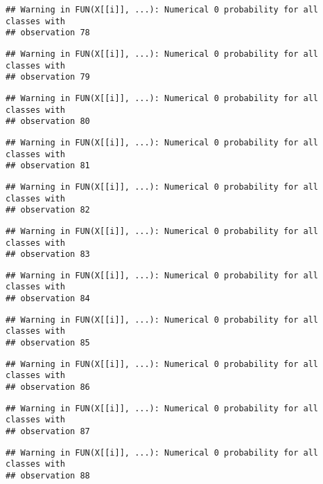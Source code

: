 \documentclass[
]{article}
\begin{document}
\begin{verbatim}
## Warning in FUN(X[[i]], ...): Numerical 0 probability for all classes with
## observation 78
\end{verbatim}

\begin{verbatim}
## Warning in FUN(X[[i]], ...): Numerical 0 probability for all classes with
## observation 79
\end{verbatim}

\begin{verbatim}
## Warning in FUN(X[[i]], ...): Numerical 0 probability for all classes with
## observation 80
\end{verbatim}

\begin{verbatim}
## Warning in FUN(X[[i]], ...): Numerical 0 probability for all classes with
## observation 81
\end{verbatim}

\begin{verbatim}
## Warning in FUN(X[[i]], ...): Numerical 0 probability for all classes with
## observation 82
\end{verbatim}

\begin{verbatim}
## Warning in FUN(X[[i]], ...): Numerical 0 probability for all classes with
## observation 83
\end{verbatim}

\begin{verbatim}
## Warning in FUN(X[[i]], ...): Numerical 0 probability for all classes with
## observation 84
\end{verbatim}

\begin{verbatim}
## Warning in FUN(X[[i]], ...): Numerical 0 probability for all classes with
## observation 85
\end{verbatim}

\begin{verbatim}
## Warning in FUN(X[[i]], ...): Numerical 0 probability for all classes with
## observation 86
\end{verbatim}

\begin{verbatim}
## Warning in FUN(X[[i]], ...): Numerical 0 probability for all classes with
## observation 87
\end{verbatim}

\begin{verbatim}
## Warning in FUN(X[[i]], ...): Numerical 0 probability for all classes with
## observation 88
\end{verbatim}
\end{document}
